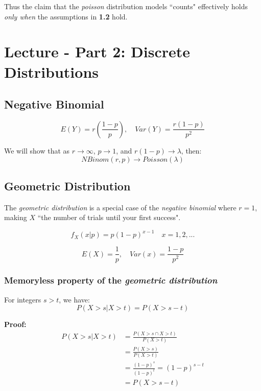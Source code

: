 \documentclass{article}
\begin{document}
\noindent Thus the claim that the \textit{poisson} distribution models ``counts" effectively holds \textit{only when} the assumptions in \textbf{1.2} hold.

\section{Lecture - Part 2: Discrete Distributions}

\subsection{Negative Binomial}

\begin{equation*}
    E(Y) = r\left(\frac{1-p}{p}\right), \quad Var(Y) = \frac{r(1-p)}{p^2}
\end{equation*}

We will show that as $r \to \infty$, $p \to 1$, and $r(1-p) \to \lambda$, then:
\begin{equation*}
    NBinom(r,p) \to Poisson(\lambda)
\end{equation*}

\subsection{Geometric Distribution}

The \textit{geometric distribution} is a special case of the \textit{negative binomial} where $r = 1$, making $X$ ``the number of trials until your first success". 

\begin{equation*}
    f_X(x|p) = p(1-p)^{x-1} \quad x = 1,2,...
\end{equation*}

\begin{equation*}
    E(X) = \frac{1}{p}, \quad Var(x) = \frac{1-p}{p^2}
\end{equation*}

\subsubsection{Memoryless property of the \textit{geometric distribution}}

For integers $s > t$, we have:
\begin{equation*}
    P(X > s | X > t) = P(X > s-t)
\end{equation*}

\noindent \textbf{Proof:}
\begin{equation*}
    \begin{split}
        P(X>s|X>t) &= \frac{P(X>s \cap X>t)}{P(X>t)}\\
            &= \frac{P(X>s)}{P(X>t)}\\
            &= \frac{(1-p)^s}{(1-p)^t} = (1-p)^{s-t}\\
            &= P(X > s-t)
    \end{split}
\end{equation*}
\end{document}
